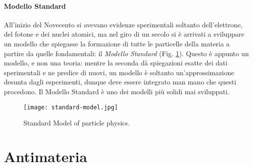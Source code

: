 \paragraph{Modello Standard}

All'inizio del Novecento si avevano evidenze sperimentali soltanto dell'elettrone, del fotone e dei nuclei atomici, ma nel giro di un secolo si è arrivati a sviluppare un modello che spiegasse la formazione di tutte le particelle della materia a partire da quelle fondamentali: il \textit{Modello Standard} (Fig. \ref{standard-model}). Questo è appunto un modello, e non una teoria: mentre la seconda dà spiegazioni esatte dei dati sperimentali e ne predice di nuovi, un modello è soltanto un'approssimazione desunta dagli esperimenti, dunque deve essere integrato man mano che questi procedono. Il Modello Standard è uno dei modelli più solidi mai sviluppati.

\begin{figure}
	\centering
	\texttt{[image: standard-model.jpg]}
	\caption{Standard Model of particle physics.}
	\label{standard-model}
\end{figure}

\section{Antimateria}

